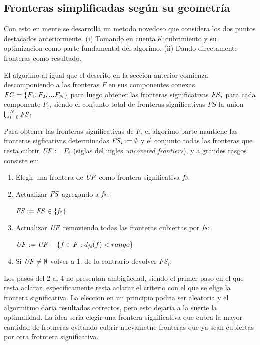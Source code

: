 \subsection{Fronteras simplificadas según su geometría}
Con esto en mente se desarrolla un metodo novedoso que considera los dos puntos
destacados anteriormente. (i) Tomando en cuenta el cubrimiento y su
optimizacion como parte fundamental del algorimo. (ii) Dando directamente
fronteras como resultado.

El algorimo al igual que el descrito en la seccion anterior comienza
descomponiendo a las fronteras $F$ en sus componentes conexas
$\mathit{FC}=\{F_1,F_2,...F_N\}$ para luego obtener las fronteras significativas
$\mathit{FS}_i$ para cada componente $F_i$, siendo el conjunto total de fronteras
significativas $FS$ la union $\bigcup^N_{i=0} \mathit{FS}_i$

Para obtener las fronteras significativas de $F_i$ el algorimo parte mantiene
las fronteras sigficativas determinadas $\mathit{FS}_i := \emptyset$ y el conjunto
todas las fronteras que resta cubrir $\mathit{UF} := F_i$ (siglas del ingles
\emph{uncovered frontiers}), y a grandes rasgos consiste en:
\begin{enumerate}
  \item Elegir una frontera de $\mathit{UF}$ como frontera significativa $\mathit{fs}$.

  \item Actualizar $\mathit{FS}$ agregando a $\mathit{fs}$:

    $\mathit{FS} := \mathit{FS} \in \{\mathit{fs}\}$

  \item Actualizar $\mathit{UF}$ removiendo todas las fronteras cubiertas por $\mathit{fs}$:

    $\mathit{UF} := \mathit{UF} - \{ f\in F : d_{\mathit{fs}}(f) < rango\}$

  \item Si $\mathit{UF} \neq \emptyset$ volver a 1. de lo contrario devolver $FS_i$.
\end{enumerate}


Los pasos del 2 al 4 no presentan ambigüedad, siendo el primer paso en el que
resta aclarar, especificamente resta aclarar el criterio con el que se elige la
frontera significativa. La eleccion en un principio podria ser aleatoria y el
algormitmo daria resultados correctos, pero esto dejaria a la suerte la
optimalidad. La idea seria elegir una frontera significativa que cubra la mayor
cantidad de frotneras evitando cubrir nuevametne fronteras que ya sean
cubiertas por otra frotntera significativa.


